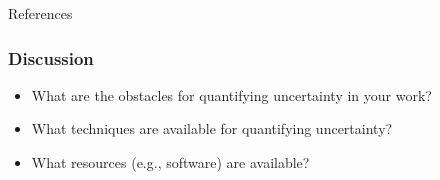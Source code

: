 \documentclass[aspectratio=169]{beamer}
\begin{document}
\begin{frame}[allowframebreaks]{References}
  
    {\scriptsize}
\end{frame}


\begin{frame}
  \frametitle{Discussion}

  \begin{itemize}
  \item What are the obstacles for quantifying uncertainty in your work?
  \item What techniques are available for quantifying uncertainty?
  \item What resources (e.g., software) are available?
  \end{itemize}
\end{frame}


\end{document}
